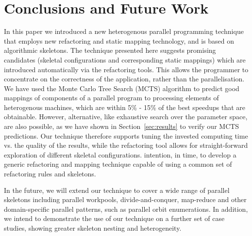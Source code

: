 \documentclass[smallextended]{svjour3}
\begin{document}
\section{Conclusions and Future Work}
\noindent
In this paper we introduced a new heterogenous parallel programming technique that employs new
refactoring and static mapping technology, and is based on algorithmic
skeletons. %
The technique presented here suggests promising candidates (skeletal configurations and corresponding static mappings) which are introduced
automatically via the refactoring tools.
This allows the programmer to concentrate on 
the correctness of the application, rather than the parallelisation. 
%
We have used the Monte Carlo Tree Search (MCTS) algorithm to predict
good mappings of components of a parallel program to processing
elements of heterogenous machines, which are within 5\% - 15\% of the best speedups that are obtainable. However, alternative, like exhaustive search over the parameter space, are also possible, as we have shown in Section~\ref{sec:results} to verify our MCTS predictions.
Our technique therefore supports tuning the invested computing time vs. the quality of the results, while the refactoring tool allows for straight-forward exploration of different skeletal configurations. %
 intention, in time, to develop
a generic refactoring and mapping technique capable of using a common set of refactoring rules and skeletons.  

In the future, we will extend our technique to cover a wide range of parallel skeletons
including parallel workpools, divide-and-conquer, map-reduce and other domain-specific
parallel patterns, such as parallel orbit enumerations.
In addition, we intend to demonstrate the use of our technique on a further set of case studies, showing greater skeleton nesting and  heterogeneity. %
\end{document}
